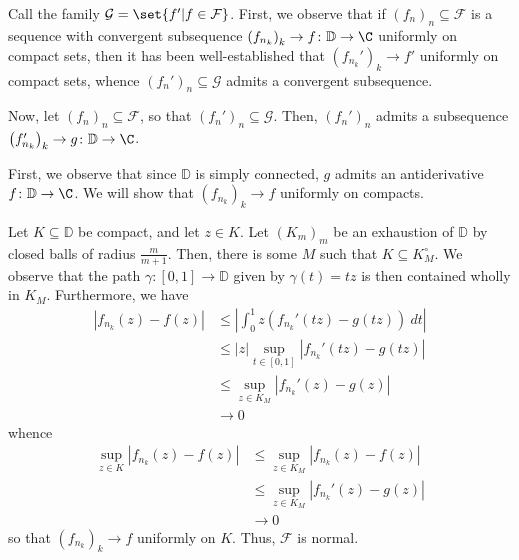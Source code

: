 \documentclass[10pt]{mypackage}
\renewcommand{\D}{\mathbb{D}}
\begin{document}
\begin{solution}
  Call the family $\mathcal{G} = \set{f' | f\in \mathcal{F}}$. First, we observe that if $\left( f_n \right)_n\subseteq \mathcal{F}$ is a sequence with convergent subsequence $\left( f_{n_k} \right)_k\rightarrow f\colon \D\rightarrow \C$ uniformly on compact sets, then it has been well-established that $\left( f_{n_k}' \right)_k\rightarrow f'$ uniformly on compact sets, whence $\left( f_n' \right)_n\subseteq \mathcal{G}$ admits a convergent subsequence.%

  Now, let $\left( f_n \right)_n\subseteq \mathcal{F}$, so that $\left( f_n' \right)_n\subseteq \mathcal{G}$. Then, $\left( f_n' \right)_n$ admits a subsequence $\left( f_{n_k}' \right)_k\rightarrow g\colon \D\rightarrow \C$.%

  First, we observe that since $\D$ is simply connected, $g$ admits an antiderivative $f\colon \D\rightarrow\C$. We will show that $\left( f_{n_k} \right)_k\rightarrow f$ uniformly on compacts.%

  Let $K\subseteq \D$ be compact, and let $z\in K$. Let $\left( K_m \right)_m$ be an exhaustion of $\D$ by closed balls of radius $\frac{m}{m+1}$. Then, there is some $M$ such that $K\subseteq K_M^{\circ}$. We observe that the path $\gamma\colon [0,1]\rightarrow \D$ given by $\gamma(t) = tz$ is then contained wholly in $K_M$. Furthermore, we have
  \begin{align*}
    \left\vert f_{n_k}(z) - f(z) \right\vert &\leq \left\vert \int_{0}^{1} z\left( f_{n_k}'(tz) - g(tz) \right)\:dt \right\vert\\
                                             &\leq \left\vert z \right\vert \sup_{t\in [0,1]}\left\vert f_{n_k}'(tz) - g(tz) \right\vert\\
                                             &\leq \sup_{z\in K_M} \left\vert f_{n_k}'(z) - g(z) \right\vert\\
                                             &\rightarrow 0
  \end{align*}
  whence
  \begin{align*}
    \sup_{z\in K} \left\vert f_{n_k}(z) - f(z) \right\vert &\leq \sup_{z\in K_M} \left\vert f_{n_k}(z) - f(z) \right\vert\\
                                                           &\leq \sup_{z\in K_M} \left\vert f_{n_k}'(z) - g(z) \right\vert\\
                                                           &\rightarrow 0
  \end{align*}
  so that $\left( f_{n_k} \right)_k\rightarrow f$ uniformly on $K$. Thus, $\mathcal{F}$ is normal.
\end{solution}
\end{document}
